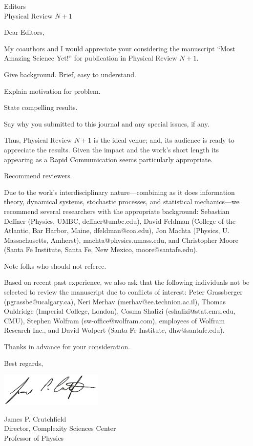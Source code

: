 \documentclass[10pt,stdletter]{newlfm}
\begin{document}
\begin{newlfm}

\date{}

\vspace{-1in}

Editors\\
Physical Review $N+1$

Dear Editors,

My coauthors and I would appreciate your considering the manuscript ``Most
Amazing Science Yet!'' for publication in Physical Review $N+1$.

Give background. Brief, easy to understand.

Explain motivation for problem.

State compelling results.

Say why you submitted to this journal and any special issues, if any.

Thus, Physical Review $N+1$ is the ideal venue; and, its audience is ready to
appreciate the results. Given the impact and the work's short length its
appearing as a Rapid Communication seems particularly appropriate.

Recommend reviewers.

Due to the work's interdisciplinary nature---combining as it does information
theory, dynamical systems, stochastic processes, and statistical mechanics---we
recommend several researchers with the appropriate background: Sebastian
Deffner (Physics, UMBC, deffner@umbc.edu), David Feldman (College of the
Atlantic, Bar Harbor, Maine, dfeldman@coa.edu), Jon Machta (Physics, U.
Massachusetts, Amherst), machta@physics.umass.edu, and Christopher Moore (Santa
Fe Institute, Santa Fe, New Mexico, moore@santafe.edu).

Note folks who should not referee.

Based on recent past experience, we also ask that the following individuals not
be selected to review the manuscript due to conflicts of interest: Peter
Grassberger (pgrassbe@ucalgary.ca), Neri Merhav (merhav@ee.technion.ac.il),
Thomas Ouldridge (Imperial College, London), Cosma Shalizi
(cshalizi@stat.cmu.edu, CMU), Stephen Wolfram (sw-office@wolfram.com),
employees of Wolfram Research Inc., and David Wolpert (Santa Fe Institute,
dhw@santafe.edu).

Thanks in advance for your consideration.

Best regards,

\includegraphics[trim = 0 0in 0 0in, width=2in]{JPCSignature}

James P. Crutchfield\\
Director, Complexity Sciences Center\\
Professor of Physics

\end{newlfm}
\end{document}
